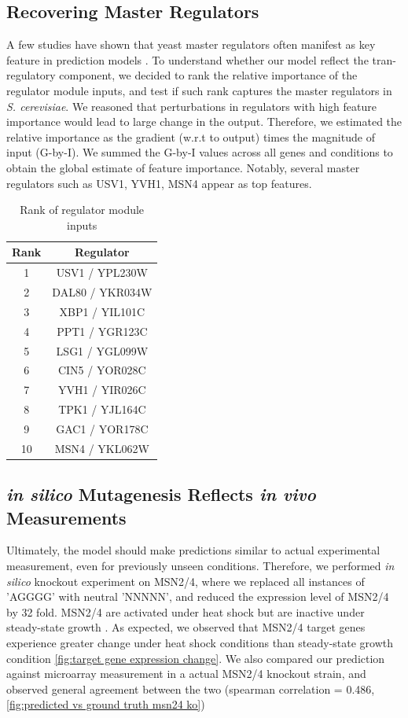 \documentclass{article}
\begin{document}
\subsection{Recovering Master Regulators}
A few studies have shown that yeast master regulators often manifest as key feature in prediction models \cite{Kundaje:2006ho}. To understand whether our model reflect the tran-regulatory component, we decided to rank the relative importance of the regulator module inputs, and test if such rank captures the master regulators in \textit{S. cerevisiae}. We reasoned that perturbations in regulators with high feature importance would lead to large change in the output. Therefore, we estimated the relative importance as the gradient (w.r.t to output) times the magnitude of input (G-by-I). We summed the G-by-I values across all genes and conditions to obtain the global estimate of feature importance. Notably, several master regulators such as USV1, YVH1, MSN4 appear as top features. 


\begin{table}[!hbt]
\caption{Rank of regulator module inputs}
\centering
 \begin{tabular}{|c | c|} 
 \hline
 Rank & Regulator \\
 \hline
 1 &  USV1 / YPL230W \\ 
 \hline
 2 & DAL80 / YKR034W \\
 \hline
 3 & XBP1 / YIL101C \\
 \hline
 4 & PPT1 / YGR123C \\
 \hline
 5 & LSG1 / YGL099W \\
 \hline
 6 & CIN5 / YOR028C \\
 \hline
 7 & YVH1 / YIR026C \\
 \hline
 8 & TPK1 / YJL164C \\
 \hline
 9 & GAC1 / YOR178C \\
 \hline
 10 & MSN4 / YKL062W \\
 \hline
\end{tabular}
\label{table:rank of regulator module inputs}
\end{table}

\subsection{\textit{in silico} Mutagenesis Reflects \textit{in vivo} Measurements}
Ultimately, the model should make predictions similar to actual experimental measurement, even for previously unseen conditions. Therefore, we performed \textit{in silico} knockout experiment on MSN2/4, where we replaced all instances of 'AGGGG' with neutral 'NNNNN', and reduced the expression level of MSN2/4 by 32 fold. MSN2/4 are activated under heat shock but are inactive under steady-state growth \cite{Sadeh:2011eg}. As expected, we observed that MSN2/4 target genes experience greater change under heat shock conditions than steady-state growth condition \ref{fig:target gene expression change}. We also compared our prediction against microarray measurement in a actual MSN2/4 knockout strain, and observed general agreement between the two (spearman correlation = 0.486, \ref{fig:predicted vs ground truth msn24 ko})
\end{document}
